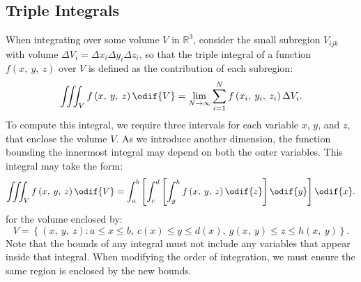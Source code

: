 \documentclass{article}
\begin{document}
\subsection{Triple Integrals}
When integrating over some volume \(V\) in \(\mathbb{R}^3\), consider
the small subregion \(V_{ijk}\) with volume \(\Delta V_i = \Delta x_i
\Delta y_i \Delta z_i\), so that the triple integral of a function
\(f\left( x, \: y, \: z \right)\) over \(V\) is defined as the
contribution of each subregion:
\begin{equation*}
    \iiint_{V} f\left( x, \: y, \: z \right) \odif{V} = \lim_{N \to \infty} \sum_{i=1}^{N} f\left( x_i, \: y_i, \: z_i \right) \Delta V_i.
\end{equation*}
To compute this integral, we require three intervals for each variable
\(x\), \(y\), and \(z\), that enclose the volume \(V\). As we introduce
another dimension, the function bounding the innermost integral may
depend on both the outer variables. This integral may take the form:
\begin{equation*}
    \iiint_{V} f\left( x, \: y, \: z \right) \odif{V} = \int_a^b \left[ \int_c^d \left[ \int_g^h f\left( x, \: y, \: z \right) \odif{z} \right] \odif{y} \right] \odif{x}.
\end{equation*}
for the volume enclosed by:
\begin{equation*}
    V = \left\{ \left( x, \: y, \: z \right) : a \leqslant x \leqslant b, \: c\left( x \right) \leqslant y \leqslant d\left( x \right), \: g\left( x, \: y \right) \leqslant z \leqslant h\left( x, \: y \right) \right\}.
\end{equation*}
Note that the bounds of any integral must not include any variables that
appear inside that integral. When modifying the order of integration,
we must ensure the same region is enclosed by the new bounds.
\end{document}
